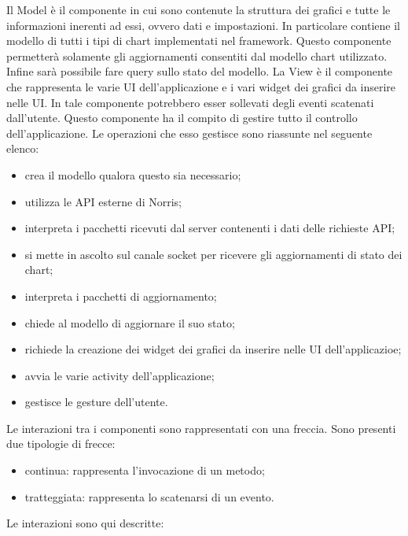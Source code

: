         Il Model è il componente in cui sono contenute la struttura dei grafici e tutte le  informazioni inerenti ad essi, ovvero dati e impostazioni. In particolare contiene il modello di tutti i tipi di chart implementati nel framework. Questo componente permetterà solamente gli aggiornamenti consentiti dal modello chart utilizzato. Infine sarà possibile fare query sullo stato del modello.
        La View è il componente che rappresenta le varie UI dell'applicazione e i vari widget dei grafici da inserire nelle UI. In tale componente potrebbero esser sollevati degli eventi scatenati dall'utente.
        Questo componente ha il compito di gestire tutto il controllo dell'applicazione. Le operazioni che esso gestisce sono riassunte nel seguente elenco:
        	\begin{itemize}
        		\item crea il modello qualora questo sia necessario;
        		\item utilizza le API esterne di Norris;
        		\item interpreta i pacchetti ricevuti dal server contenenti i dati delle richieste API;
        		\item si mette in ascolto sul canale socket per ricevere gli aggiornamenti di stato dei chart;
        		\item interpreta i pacchetti di aggiornamento;
        		\item chiede al modello di aggiornare il suo stato;
        		\item richiede la creazione dei widget dei grafici da inserire nelle UI dell'applicazioe;
        		\item avvia le varie activity dell'applicazione;
        		\item gestisce le gesture dell'utente.
        \end{itemize}
    	Le interazioni tra i componenti sono rappresentati con una freccia. Sono presenti due tipologie di frecce:
    	\begin{itemize}
    			\item{continua: } rappresenta l'invocazione di un metodo;
    			\item{tratteggiata: } rappresenta lo scatenarsi di un evento.
    		\end{itemize}
    	Le interazioni sono qui descritte:
